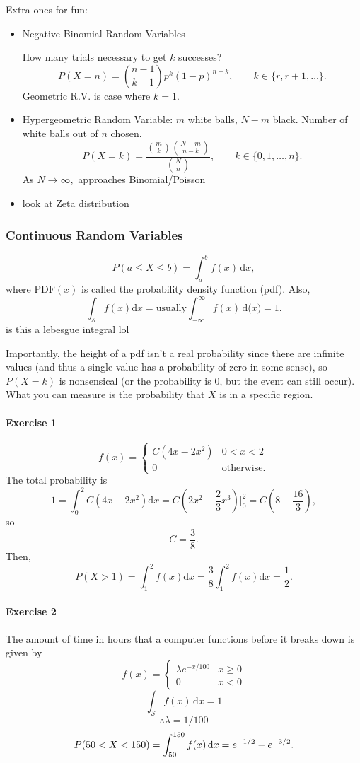 \documentclass[12pt]{article}
\newcommand{\diffn}[1]{\,\mathrm{d}{#1}}
\begin{document}
Extra ones for fun:
\begin{itemize}
    \item Negative Binomial Random Variables

    How many trials necessary to get $k$ successes?
    \[P(X=n)=\binom{n-1}{k-1}p^k(1-p)^{n-k},\qquad k\in\{r,r+1,\dots\}.\]
    Geometric R.V. is case where $k=1.$
    \item Hypergeometric Random Variable:
    $m$ white balls, $N-m$ black. Number of white balls out of $n$ chosen.
    \[P(X=k) = \frac{\binom{m}{k}\binom{N-m}{n-k}}{\binom{N}{n}},\qquad k\in\{0,1,\dots,n\}.\]
    As $N\to\infty,$ approaches Binomial/Poisson
    \item look at Zeta distribution
\end{itemize}

\subsubsection{Continuous Random Variables}
\[P(a\le X\le b) = \int_a^b f(x)\,\mathrm{d}x,\]
where $\text{PDF}(x)$ is called the probability density function (pdf).
Also,
\[\int_\mathcal{S}f(x)\mathrm{d}x=\text{usually}\int_{-\infty}^\infty f(x)\diffn(x)=1.\] is this a lebesgue integral lol



Importantly, the height of a pdf isn't a real probability since there are infinite values (and thus a single value has a probability of zero in some sense),
so $P(X=k)$ is nonsensical (or the probability is 0, but the event can still occur). What you can measure is the probability that $X$ is in a specific region.


\paragraph{Exercise 1}
\[f(x) = \begin{cases}
    C(4x-2x^2)&0<x<2\\
    0&\text{otherwise}.
\end{cases}\]
The total probability is
\[1=\int_0^2C(4x-2x^2)\mathrm{d}x=C\left(2x^2-\frac{2}{3}x^3\right)\bigg\vert_0^2=C\left(8-\frac{16}{3}\right),\]
so
\[C=\frac{3}{8}.\]
Then,
\[P(X>1)=\int_1^2f(x)\mathrm{d}x=\frac{3}{8}\int_1^2f(x)\mathrm{d}x=\frac{1}{2}.\]
\paragraph{Exercise 2} The amount of time in hours that a computer functions before it breaks down is given by \[f(x) = \begin{cases}
    \lambda e^{-x/100} & x \ge 0 \\
    0 & x < 0
\end{cases}\]
\[
\int_\mathcal{S} f(x)\,\mathrm{d}x = 1
\]
\[
\therefore \lambda = 1/100
\]
\[
P(50<X<150) = \int_{50}^{150} f(x)\,\mathrm{d}x=e^{-1/2}-e^{-3/2}.\\
\]
\end{document}
